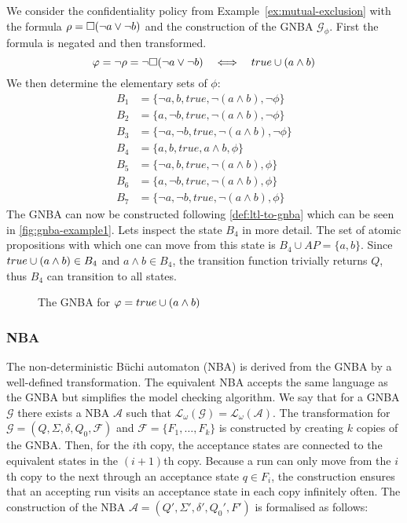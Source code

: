 \begin{example}
We consider the confidentiality policy from Example~\ref{ex:mutual-exclusion} with the formula $\rho = \square(\lnot a \lor \lnot b)$ and the construction of the GNBA $\mathcal{G}_\phi$. First the formula is negated and then transformed.
\begin{equation*}
    \varphi = \lnot \rho = \lnot \square(\lnot a \lor \lnot b) \quad\Longleftrightarrow\quad true \cup (a \land b)
\end{equation*}
We then determine the elementary sets of $\phi$:
\begin{align*}
    B_1 &= \{\lnot a, b, true, \lnot(a \land b), \lnot\phi\} \\
    B_2 &= \{a, \lnot b, true, \lnot(a \land b), \lnot\phi\} \\
    B_3 &= \{\lnot a, \lnot b, true, \lnot(a \land b), \lnot\phi\} \\
    B_4 &= \{a, b, true, a \land b, \phi\} \\
    B_5 &= \{\lnot a, b, true, \lnot(a \land b), \phi\} \\
    B_6 &= \{a, \lnot b, true, \lnot(a \land b), \phi\} \\
    B_7 &= \{\lnot a, \lnot b, true, \lnot(a \land b), \phi\}
\end{align*}
The GNBA can now be constructed following \autoref{def:ltl-to-gnba} which can be seen in \autoref{fig:gnba-example1}. Lets inspect the state $B_4$ in more detail. The set of atomic propositions with which one can move from this state is $B_4 \cup AP = \{a,b\}$. Since $true \cup (a \land b) \in B_4$ and $a \land b \in B_4$, the transition function trivially returns $Q$, thus $B_4$ can transition to all states.

\begin{figure}[!ht]
    \centering
    
    \caption{The GNBA for $\varphi=true\cup (a \land b)$}
    \label{fig:gnba-example1}
\end{figure}
\end{example}

\subsubsection{NBA}
The non-deterministic Büchi automaton (NBA) is derived from the GNBA by a well-defined transformation. The equivalent NBA accepts the same language as the GNBA but simplifies the model checking algorithm. We say that for a GNBA $\mathcal{G}$ there exists a NBA $\mathcal{A}$ such that $\mathcal{L}_\omega(\mathcal{G})=\mathcal{L}_\omega(\mathcal{A})$. The transformation for $\mathcal{G}=(Q,\Sigma,\delta,Q_0,\mathcal{F})$ and $\mathcal{F}=\{F_1,\ldots,F_k\}$ is constructed by creating $k$ copies of the GNBA. Then, for the $i$th copy, the acceptance states are connected to the equivalent states in the $(i+1)$th copy. Because a run can only move from the $i$th copy to the next through an acceptance state $q \in F_i$, the construction ensures that an accepting run visits an acceptance state in each copy infinitely often. The construction of the NBA $\mathcal{A}=(Q',\Sigma',\delta',Q_0',F')$ is formalised as follows:

